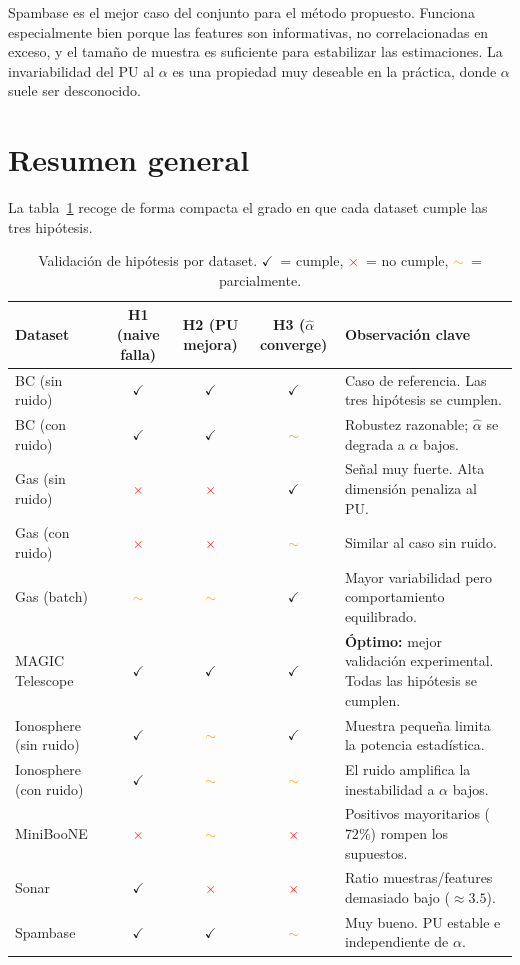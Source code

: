 \documentclass[a4paper,11pt]{article}
\newcommand{\yes}{\textcolor{green!60!black}{$\checkmark$}}
\newcommand{\no}{\textcolor{red}{$\times$}}
\newcommand{\meh}{\textcolor{orange}{$\sim$}}
\begin{document}
Spambase es el mejor caso del conjunto para el método propuesto. Funciona especialmente bien porque las features son informativas, no correlacionadas en exceso, y el tamaño de muestra es suficiente para estabilizar las estimaciones. La invariabilidad del PU al $\alpha$ es una propiedad muy deseable en la práctica, donde $\alpha$ suele ser desconocido.

\section{Resumen general}

La tabla~\ref{tab:resumen} recoge de forma compacta el grado en que cada dataset cumple las tres hipótesis.

\begin{table}[H]
\centering
\caption{Validación de hipótesis por dataset. \yes~= cumple, \no~= no cumple, \meh~= parcialmente.}
\label{tab:resumen}
\begin{tabular}{lcccp{5.5cm}}
\toprule
Dataset & H1 (naive falla) & H2 (PU mejora) & H3 ($\hat{\alpha}$ converge) & Observación clave \\
\midrule
BC (sin ruido)         & \yes & \yes & \yes & Caso de referencia. Las tres hipótesis se cumplen. \\
BC (con ruido)         & \yes & \yes & \meh & Robustez razonable; $\hat{\alpha}$ se degrada a $\alpha$ bajos. \\
Gas (sin ruido)        & \no  & \no  & \yes & Señal muy fuerte. Alta dimensión penaliza al PU. \\
Gas (con ruido)        & \no  & \no  & \meh & Similar al caso sin ruido. \\
Gas (batch)            & \meh & \meh & \yes & Mayor variabilidad pero comportamiento equilibrado. \\
MAGIC Telescope        & \yes & \yes & \yes & \textbf{Óptimo:} mejor validación experimental. Todas las hipótesis se cumplen. \\
Ionosphere (sin ruido) & \yes & \meh & \yes & Muestra pequeña limita la potencia estadística. \\
Ionosphere (con ruido) & \yes & \meh & \meh & El ruido amplifica la inestabilidad a $\alpha$ bajos. \\
MiniBooNE              & \no  & \meh & \no  & Positivos mayoritarios ($72\%$) rompen los supuestos. \\
Sonar                  & \yes & \no  & \no  & Ratio muestras/features demasiado bajo ($\approx 3.5$). \\
Spambase               & \yes & \yes & \meh & Muy bueno. PU estable e independiente de $\alpha$. \\
\bottomrule
\end{tabular}
\end{table}
\end{document}
